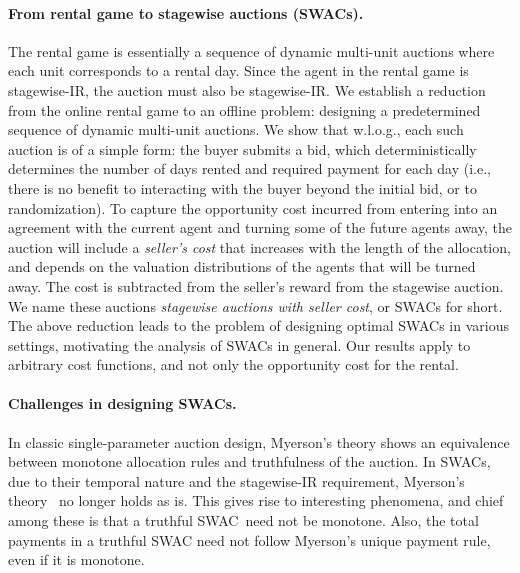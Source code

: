 \documentclass[11pt,letterpaper]{article}
\newcommand{\swir}{stagewise-IR\xspace}
\newcommand{\swac}{SWAC\xspace}
\newcommand{\swacs}{SWACs\xspace}
\theoremstyle{plain}
\begin{document}
\paragraph{From rental game to stagewise auctions (\swacs).}
The rental game is essentially a sequence of dynamic multi-unit auctions where each unit corresponds to a rental day. Since the agent in the rental game is \swir, the auction must also be \swir. 
We establish a reduction from the online rental game to an offline problem: designing a predetermined sequence of dynamic multi-unit auctions. We show that w.l.o.g., each such auction is of a simple form: the buyer submits a bid, which deterministically determines the number of days rented and required payment for each day (i.e., there is no benefit to interacting with the buyer beyond the initial bid, or to randomization). To capture the opportunity cost incurred from entering into an agreement with the current agent and turning some of the future agents away, the auction will include a \emph{seller's cost} that increases with the length of the allocation, and depends on the valuation distributions of the agents that will be turned away. The cost is subtracted from the seller's reward from the stagewise auction. We name these auctions \emph{stagewise auctions with seller cost}, or \swacs for short.
The above reduction leads to the problem of designing optimal \swacs in various settings, motivating the analysis of \swacs in general. Our results apply to arbitrary cost functions, and not only the opportunity cost for the rental.


\paragraph{Challenges in designing \swacs.}

In classic single-parameter auction design, Myerson's theory shows an equivalence between monotone allocation rules and truthfulness of the auction. In \swacs, due to their temporal nature and the \swir requirement, Myerson's theory~\cite{myerson1981optimal} no longer holds as is. This gives rise to interesting phenomena, and chief among these is that a truthful \swac\ need not be monotone. Also, the total payments in a truthful \swac need not follow Myerson's unique payment rule, even if it is monotone.
\end{document}
